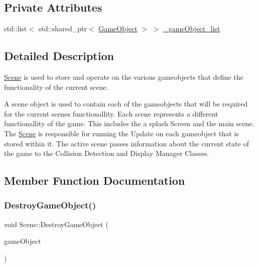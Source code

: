 \subsection*{Private Attributes}
\begin{DoxyCompactItemize}
\item 
std\+::list$<$ std\+::shared\+\_\+ptr$<$ \hyperlink{class_game_object}{Game\+Object} $>$ $>$ \hyperlink{class_scene_a3ce74c2bdeb1bca46221645b309aa8cf}{\+\_\+game\+Object\+\_\+list}
\end{DoxyCompactItemize}


\subsection{Detailed Description}
\hyperlink{class_scene}{Scene} is used to store and operate on the various gameobjects that define the functionality of the current scene. 

A scene object is used to contain each of the gameobjects that will be required for the current scenes functionallity. Each scene represents a different functionallity of the game. This includes the a splash Screen and the main scene. The \hyperlink{class_scene}{Scene} is responsible for running the Update on each gameobject that is stored within it. The active scene passes information about the current state of the game to the Collision Detection and Display Manager Classes. 

\subsection{Member Function Documentation}
\mbox{\label{class_scene_a2e47a6610a3bb6e85373f5b297645754}} 
\subsubsection{\texorpdfstring{Destroy\+Game\+Object()}{DestroyGameObject()}}
{\footnotesize\ttfamily void Scene\+::\+Destroy\+Game\+Object (\begin{DoxyParamCaption}\item[{std\+::shared\+\_\+ptr$<$ \hyperlink{class_game_object}{Game\+Object} $>$}]{game\+Object }\end{DoxyParamCaption})}



